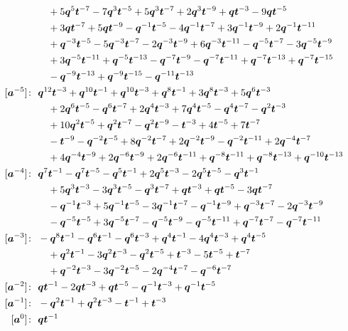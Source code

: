 \begin{align*}
& \quad +5 \bq^{5} \bt^{-7} -7 \bq^{3} \bt^{-5} +5 \bq^{3} \bt^{-7} +2 \bq^{3} \bt^{-9} +\bq \bt^{-3} -9 \bq \bt^{-5} \\
& \quad +3 \bq \bt^{-7} +5 \bq \bt^{-9} -\bq^{-1} \bt^{-5} -4 \bq^{-1} \bt^{-7} +3 \bq^{-1} \bt^{-9} +2 \bq^{-1} \bt^{-11} \\
& \quad +\bq^{-3} \bt^{-5} -5 \bq^{-3} \bt^{-7} -2 \bq^{-3} \bt^{-9} +6 \bq^{-3} \bt^{-11} -\bq^{-5} \bt^{-7} -3 \bq^{-5} \bt^{-9} \\
& \quad +3 \bq^{-5} \bt^{-11} +\bq^{-5} \bt^{-13} -\bq^{-7} \bt^{-9} -\bq^{-7} \bt^{-11} +\bq^{-7} \bt^{-13} +\bq^{-7} \bt^{-15} \\
& \quad -\bq^{-9} \bt^{-13} +\bq^{-9} \bt^{-15} -\bq^{-11} \bt^{-13} \\
[\ba^{-5}]\colon\ & \bq^{12} \bt^{-3} +\bq^{10} \bt^{-1} +\bq^{10} \bt^{-3} +\bq^{8} \bt^{-1} +3 \bq^{8} \bt^{-3} +5 \bq^{6} \bt^{-3} \\
& \quad +2 \bq^{6} \bt^{-5} -\bq^{6} \bt^{-7} +2 \bq^{4} \bt^{-3} +7 \bq^{4} \bt^{-5} -\bq^{4} \bt^{-7} -\bq^{2} \bt^{-3} \\
& \quad +10 \bq^{2} \bt^{-5} +\bq^{2} \bt^{-7} -\bq^{2} \bt^{-9} -\bt^{-3} +4 \bt^{-5} +7 \bt^{-7} \\
& \quad -\bt^{-9} -\bq^{-2} \bt^{-5} +8 \bq^{-2} \bt^{-7} +2 \bq^{-2} \bt^{-9} -\bq^{-2} \bt^{-11} +2 \bq^{-4} \bt^{-7} \\
& \quad +4 \bq^{-4} \bt^{-9} +2 \bq^{-6} \bt^{-9} +2 \bq^{-6} \bt^{-11} +\bq^{-8} \bt^{-11} +\bq^{-8} \bt^{-13} +\bq^{-10} \bt^{-13} \\
[\ba^{-4}]\colon\ & \bq^{7} \bt^{-1} -\bq^{7} \bt^{-5} -\bq^{5} \bt^{-1} +2 \bq^{5} \bt^{-3} -2 \bq^{5} \bt^{-5} -\bq^{3} \bt^{-1} \\
& \quad +5 \bq^{3} \bt^{-3} -3 \bq^{3} \bt^{-5} -\bq^{3} \bt^{-7} +\bq \bt^{-3} +\bq \bt^{-5} -3 \bq \bt^{-7} \\
& \quad -\bq^{-1} \bt^{-3} +5 \bq^{-1} \bt^{-5} -3 \bq^{-1} \bt^{-7} -\bq^{-1} \bt^{-9} +\bq^{-3} \bt^{-7} -2 \bq^{-3} \bt^{-9} \\
& \quad -\bq^{-5} \bt^{-5} +3 \bq^{-5} \bt^{-7} -\bq^{-5} \bt^{-9} -\bq^{-5} \bt^{-11} +\bq^{-7} \bt^{-7} -\bq^{-7} \bt^{-11} \\
[\ba^{-3}]\colon\ & -\bq^{8} \bt^{-1} -\bq^{6} \bt^{-1} -\bq^{6} \bt^{-3} +\bq^{4} \bt^{-1} -4 \bq^{4} \bt^{-3} +\bq^{4} \bt^{-5} \\
& \quad +\bq^{2} \bt^{-1} -3 \bq^{2} \bt^{-3} -\bq^{2} \bt^{-5} +\bt^{-3} -5 \bt^{-5} +\bt^{-7} \\
& \quad +\bq^{-2} \bt^{-3} -3 \bq^{-2} \bt^{-5} -2 \bq^{-4} \bt^{-7} -\bq^{-6} \bt^{-7} \\
[\ba^{-2}]\colon\ & \bq \bt^{-1} -2 \bq \bt^{-3} +\bq \bt^{-5} -\bq^{-1} \bt^{-3} +\bq^{-1} \bt^{-5} \\
[\ba^{-1}]\colon\ & -\bq^{2} \bt^{-1} +\bq^{2} \bt^{-3} -\bt^{-1} +\bt^{-3} \\
[\ba^{0}]\colon\ & \bq \bt^{-1}
\end{align*}

